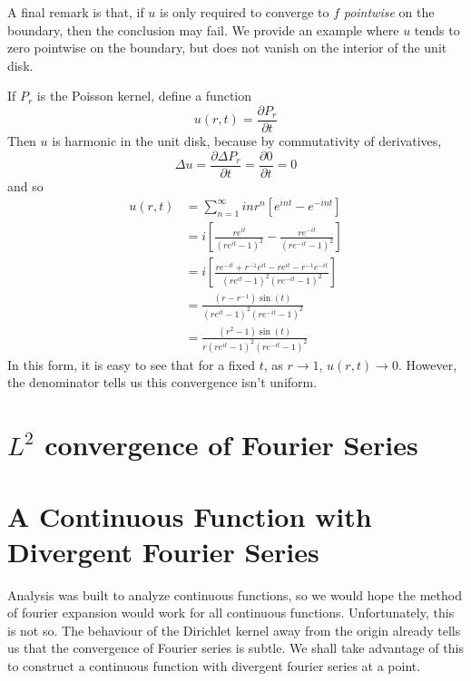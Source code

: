 A final remark is that, if $u$ is only required to converge to $f$ {\it pointwise} on the boundary, then the conclusion may fail. We provide an example where $u$ tends to zero pointwise on the boundary, but does not vanish on the interior of the unit disk.

\begin{example}
    If $P_r$ is the Poisson kernel, define a function
    \[ u(r,t) = \frac{\partial P_r}{\partial t} \]
    Then $u$ is harmonic in the unit disk, because by commutativity of derivatives,
    \[ \Delta u = \frac{\partial \Delta P_r}{\partial t} = \frac{\partial 0}{\partial t} = 0 \]
    and so
    \begin{align*}
        u(r,t) &= \sum_{n = 1}^\infty in r^n [e^{int} - e^{-int}]\\
        &= i \left[ \frac{r e^{it}}{(re^{it} - 1)^2} - \frac{r e^{-it}}{(re^{-it} - 1)^2} \right]\\
        &= i \left[ \frac{re^{-it} + r^{-1}e^{it} - re^{it} - r^{-1}e^{-it}}{(re^{it} - 1)^2(re^{-it} - 1)^2} \right]\\
        &= \frac{(r - r^{-1}) \sin(t)}{(re^{it} - 1)^2(re^{-it} - 1)^2}\\
        &= \frac{(r^2 - 1) \sin(t)}{r (re^{it} - 1)^2(re^{-it} - 1)^2}
    \end{align*}
    In this form, it is easy to see that for a fixed $t$, as $r \to 1$, $u(r,t) \to 0$. However, the denominator tells us this convergence isn't uniform.
\end{example}

\section{$L^2$ convergence of Fourier Series}

\section{A Continuous Function with Divergent Fourier Series}

Analysis was built to analyze continuous functions, so we would hope the method of fourier expansion would work for all continuous functions. Unfortunately, this is not so. The behaviour of the Dirichlet kernel away from the origin already tells us that the convergence of Fourier series is subtle. We shall take advantage of this to construct a continuous function with divergent fourier series at a point.

